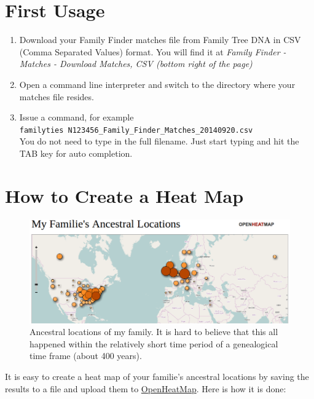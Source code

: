 \documentclass[12pt,a4paper]{article}
\begin{document}
\section{First Usage}

\begin{enumerate}
\item Download your Family Finder matches file from Family Tree DNA
   in CSV (Comma Separated Values) format. You will find it at
   \emph{Family Finder - Matches - Download Matches, CSV
   (bottom right of the page)}
\item Open a command line interpreter and switch to the
   directory where your matches file resides.
\item Issue a command, for example\\
  \texttt{familyties N123456\_Family\_Finder\_Matches\_20140920.csv}\\
  You do not need to type in the full filename. Just start typing and
  hit the TAB key for auto completion.
\end{enumerate}


\section{How to Create a Heat Map}

\begin{figure}[ht]
\centering
\includegraphics[width=13cm]{ancestral-locations.png}
\caption{Ancestral locations of my family. It is hard
to believe that this all happened within the relatively 
short time period of a genealogical time frame (about 400 years).}
\end{figure}

It is easy to create a heat map of your familie's ancestral locations
by saving the results to a file and upload them to
\href{http://www.openheatmap.com/}{OpenHeatMap}.
Here is how it is done:
\end{document}

